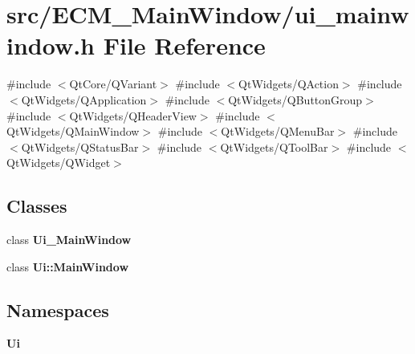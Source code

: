 \section{src/\+E\+C\+M\+\_\+\+Main\+Window/ui\+\_\+mainwindow.h File Reference}
\label{ui__mainwindow_8h}
{\ttfamily \#include $<$Qt\+Core/\+Q\+Variant$>$}\newline
{\ttfamily \#include $<$Qt\+Widgets/\+Q\+Action$>$}\newline
{\ttfamily \#include $<$Qt\+Widgets/\+Q\+Application$>$}\newline
{\ttfamily \#include $<$Qt\+Widgets/\+Q\+Button\+Group$>$}\newline
{\ttfamily \#include $<$Qt\+Widgets/\+Q\+Header\+View$>$}\newline
{\ttfamily \#include $<$Qt\+Widgets/\+Q\+Main\+Window$>$}\newline
{\ttfamily \#include $<$Qt\+Widgets/\+Q\+Menu\+Bar$>$}\newline
{\ttfamily \#include $<$Qt\+Widgets/\+Q\+Status\+Bar$>$}\newline
{\ttfamily \#include $<$Qt\+Widgets/\+Q\+Tool\+Bar$>$}\newline
{\ttfamily \#include $<$Qt\+Widgets/\+Q\+Widget$>$}\newline
\subsection*{Classes}
\begin{DoxyCompactItemize}
\item 
class \textbf{ Ui\+\_\+\+Main\+Window}
\item 
class \textbf{ Ui\+::\+Main\+Window}
\end{DoxyCompactItemize}
\subsection*{Namespaces}
\begin{DoxyCompactItemize}
\item 
 \textbf{ Ui}
\end{DoxyCompactItemize}
